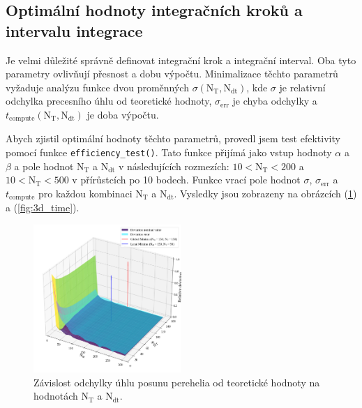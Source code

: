 \documentclass[a4paper,11pt,twocolumn]{article}
\begin{document}
        \subsection{Optimální hodnoty integračních kroků a intervalu integrace} 
        \label{sec:optimal}
            Je velmi důležité správně definovat integrační krok a integrační interval. Oba tyto parametry ovlivňují přesnost a dobu výpočtu. Minimalizace těchto parametrů vyžaduje analýzu funkce dvou proměnných $\sigma(\text{N}_{\text{T}}, \text{N}_{\text{dt}})$, kde $\sigma$ je relativní odchylka precesního úhlu od teoretické hodnoty, $\sigma_{\text{err}}$ je chyba odchylky a $t_{\text{compute}}(\text{N}_{\text{T}}, \text{N}_{\text{dt}})$ je doba výpočtu.
            
            Abych zjistil optimální hodnoty těchto parametrů, provedl jsem test efektivity pomocí funkce \texttt{efficiency\_test()}. Tato funkce přijímá jako vstup hodnoty $\alpha$ a $\beta$ a pole hodnot $\text{N}_{\text{T}}$ a $\text{N}_{\text{dt}}$ v následujících rozmezích: $10 < \text{N}_{\text{T}} < 200$ a $10 < \text{N}_{\text{T}} < 500$ v přírůstcích po 10 bodech. Funkce vrací pole hodnot $\sigma$, $\sigma_{\text{err}}$ a $t_{\text{compute}}$ pro každou kombinaci $\text{N}_{\text{T}}$ a $\text{N}_{\text{dt}}$. Vysledky jsou zobrazeny na obrázcích (\ref{fig:3d_deviation}) a (\ref{fig:3d_time}).

            \begin{figure}
                \centering
                \includegraphics[width=0.5\textwidth]{3d_deviation.png}
                \caption{Závislost odchylky úhlu posunu perehelia od teoretické hodnoty na hodnotách $\text{N}_{\text{T}}$ a $\text{N}_{\text{dt}}$.}
                \label{fig:3d_deviation}
            \end{figure}
\end{document}
